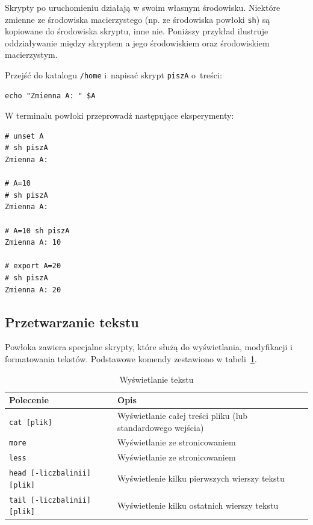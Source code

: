 \begin{example}
Skrypty po uruchomieniu działają w swoim własnym środowisku. Niektóre zmienne ze środowiska macierzystego (np. ze środowiska powłoki \lstinline[style=MyBashStyle]{sh}) są kopiowane do środowiska skryptu, inne nie. Poniższy przykład ilustruje oddziaływanie między skryptem a jego środowiskiem oraz środowiskiem macierzystym.

Przejść do katalogu \lstinline[style=MyBashStyle]{/home} i~napisać skrypt \lstinline[style=MyBashStyle]{piszA} o~treści:

\begin{lstlisting}[style=MyBashStyle,deletekeywords={echo}]
echo "Zmienna A: " $A
\end{lstlisting}

W terminalu powłoki przeprowadź następujące eksperymenty:

\begin{lstlisting}[style=MyBashStyle,deletekeywords={echo}]
# unset A
# sh piszA
Zmienna A:

# A=10
# sh piszA
Zmienna A:

# A=10 sh piszA
Zmienna A: 10

# export A=20
# sh piszA
Zmienna A: 20
\end{lstlisting}

\end{example}

\subsection{Przetwarzanie tekstu}

Powłoka zawiera specjalne skrypty, które służą do wyświetlania, modyfikacji i formatowania tekstów. Podstawowe komendy zestawiono w tabeli~\ref{tab:wyswietl}.

\begin{table}[h!]
\centering
\caption{Wyświetlanie tekstu}
\setlength{\arrayrulewidth}{1pt}
\setlength{\tabcolsep}{6pt}
\renewcommand{\arraystretch}{1.2}
\begin{tabular}{ |p{}|p{}|}
\hline \rowcolor{gray}
\textbf{Polecenie} & \textbf{Opis} \\ \hline
\mbox{\lstinline[style=MyBashStyle]{cat [plik]}} & Wyświetlanie całej treści pliku (lub standardowego wejścia) \\ \hline
\mbox{\lstinline[style=MyBashStyle]{more}} & Wyświetlanie ze stronicowaniem \\ \hline
\mbox{\lstinline[style=MyBashStyle]{less}} & Wyświetlanie ze stronicowaniem \\ \hline
\mbox{\lstinline[style=MyBashStyle]{head [-liczbalinii] [plik]}}  & Wyświetlenie kilku pierwszych wierszy tekstu \\ \hline
\mbox{\lstinline[style=MyBashStyle]{tail [-liczbalinii] [plik]}}  & Wyświetlenie kilku ostatnich wierszy tekstu \\ \hline
\end{tabular}
\label{tab:wyswietl}
\end{table}

